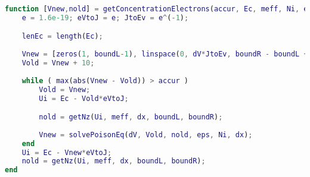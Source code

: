 \begin{lstlisting}[style=realcode,language=Matlab,caption={Алгоритм оценки дипломных работ}]
function [Vnew,nold] = getConcentrationElectrons(accur, Ec, meff, Ni, eps, dx, dV, boundL, boundR)
	e = 1.6e-19; eVtoJ = e; JtoEv = e^(-1); 	

	lenEc = length(Ec);
	
	Vnew = [zeros(1, boundL-1), linspace(0, dV*JtoEv, boundR - boundL + 1), dV*JtoEv*ones(1, lenEc - boundR)];
	Vold = Vnew + 10;
	
	while ( max(abs(Vnew - Vold)) > accur )
		Vold = Vnew;
		Ui = Ec - Vold*eVtoJ;

		nold = getNz(Ui, meff, dx, boundL, boundR);
        
        Vnew = solvePoisonEq(dV, Vold, nold, eps, Ni, dx);
	end
	Ui = Ec - Vnew*eVtoJ;
	nold = getNz(Ui, meff, dx, boundL, boundR);
end
\end{lstlisting}

